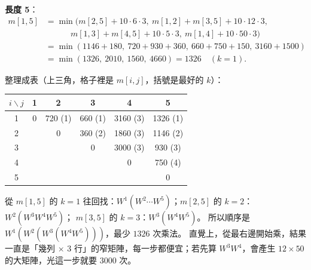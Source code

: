 \begin{pastsoln}
\textbf{長度 5}：
\begin{align*}
m[1,5] &= \min\bigl(m[2,5] + 10 \cdot 6 \cdot 3,\ m[1,2] + m[3,5] + 10 \cdot 12 \cdot 3, \\
  &\qquad\quad m[1,3] + m[4,5] + 10 \cdot 5 \cdot 3,\ m[1,4] + 10 \cdot 50 \cdot 3\bigr) \\
  &= \min(1146 + 180,\ 720 + 930 + 360,\ 660 + 750 + 150,\ 3160 + 1500) \\
  &= \min(1326,\ 2010,\ 1560,\ 4660) = 1326 \quad (k = 1).
\end{align*}

整理成表（上三角，格子裡是 $m[i, j]$，括號是最好的 $k$）：
\begin{center}
\small
\begin{tabular}{c|ccccc}
$i \backslash j$ & 1 & 2 & 3 & 4 & 5 \\
\hline
1 & 0 & 720 (1) & 660 (1) & 3160 (3) & 1326 (1) \\
2 &   & 0 & 360 (2) & 1860 (3) & 1146 (2) \\
3 &   &   & 0 & 3000 (3) & 930 (3) \\
4 &   &   &   & 0 & 750 (4) \\
5 &   &   &   &   & 0 \\
\end{tabular}
\end{center}
從 $m[1,5]$ 的 $k = 1$ 往回找：$W^1 (W^2 \cdots W^5)$；$m[2,5]$ 的 $k = 2$：$W^2 (W^3 W^4 W^5)$；
$m[3,5]$ 的 $k = 3$：$W^3 (W^4 W^5)$。 所以順序是 $W^1(W^2(W^3(W^4 W^5)))$，最少 $1326$ 次乘法。
直覺上，從最右邊開始乘，結果一直是「幾列 $\times$ 3 行」的窄矩陣，每一步都便宜；若先算
$W^3 W^4$，會產生 $12 \times 50$ 的大矩陣，光這一步就要 $3000$ 次。
\end{pastsoln}
